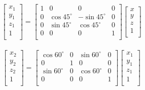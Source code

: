 \documentclass[a4paper,10pt]{jsarticle}
\begin{document}
\begin{eqnarray}
\label{eq:a}
  \left[
    \begin{array}{c}
      x_1\\
      y_1\\
      z_1\\
      1\\
    \end{array}
  \right] =
  \left[
    \begin{array}{cccc}
      1 & 0 & 0 & 0 \\
      0 & \cos{45^\circ} & -\sin{45^\circ} & 0\\
      0 & \sin{45^\circ} & \cos{45^\circ} & 0\\
      0 & 0 & 0 & 1\\
    \end{array}
  \right]\left[
    \begin{array}{c}
      x\\
      y\\
      z\\
      1\\
    \end{array}
  \right]
\end{eqnarray}

\begin{eqnarray}
\label{eq:b}
  \left[
    \begin{array}{c}
      x_2\\
      y_2\\
      z_2\\
      1\\
    \end{array}
  \right] =
  \left[
    \begin{array}{cccc}
      \cos{60^\circ} & 0 & \sin{60^\circ} & 0 \\
      0 & 1 & 0 & 0\\
      \sin{60^\circ} & 0 & \cos{60^\circ} & 0\\
      0 & 0 & 0 & 1\\
    \end{array}
  \right]\left[
    \begin{array}{c}
      x_1\\
      y_1\\
      z_1\\
      1\\
    \end{array}
  \right]
\end{eqnarray}
\end{document}
